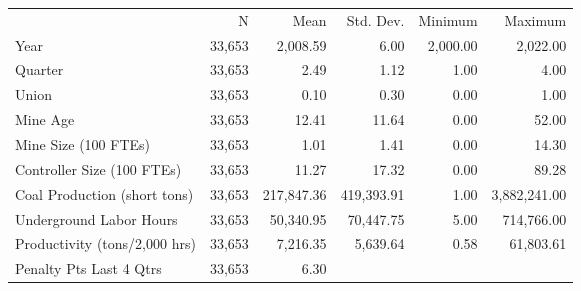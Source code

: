 \begin{table}[!h]
\centering
\begin{tabular}{llllll}
\cline{1-6}
\multicolumn{1}{c}{} &
  \multicolumn{1}{|r}{N} &
  \multicolumn{1}{r}{Mean} &
  \multicolumn{1}{r}{Std. Dev.} &
  \multicolumn{1}{r}{Minimum} &
  \multicolumn{1}{r}{Maximum} \\
\cline{1-6}
\multicolumn{1}{l}{Year} &
  \multicolumn{1}{|r}{33,653} &
  \multicolumn{1}{r}{2,008.59} &
  \multicolumn{1}{r}{6.00} &
  \multicolumn{1}{r}{2,000.00} &
  \multicolumn{1}{r}{2,022.00} \\
\multicolumn{1}{l}{Quarter} &
  \multicolumn{1}{|r}{33,653} &
  \multicolumn{1}{r}{2.49} &
  \multicolumn{1}{r}{1.12} &
  \multicolumn{1}{r}{1.00} &
  \multicolumn{1}{r}{4.00} \\
\multicolumn{1}{l}{Union} &
  \multicolumn{1}{|r}{33,653} &
  \multicolumn{1}{r}{0.10} &
  \multicolumn{1}{r}{0.30} &
  \multicolumn{1}{r}{0.00} &
  \multicolumn{1}{r}{1.00} \\
\multicolumn{1}{l}{Mine Age} &
  \multicolumn{1}{|r}{33,653} &
  \multicolumn{1}{r}{12.41} &
  \multicolumn{1}{r}{11.64} &
  \multicolumn{1}{r}{0.00} &
  \multicolumn{1}{r}{52.00} \\
\multicolumn{1}{l}{Mine Size (100 FTEs)} &
  \multicolumn{1}{|r}{33,653} &
  \multicolumn{1}{r}{1.01} &
  \multicolumn{1}{r}{1.41} &
  \multicolumn{1}{r}{0.00} &
  \multicolumn{1}{r}{14.30} \\
\multicolumn{1}{l}{Controller Size (100 FTEs)} &
  \multicolumn{1}{|r}{33,653} &
  \multicolumn{1}{r}{11.27} &
  \multicolumn{1}{r}{17.32} &
  \multicolumn{1}{r}{0.00} &
  \multicolumn{1}{r}{89.28} \\
\multicolumn{1}{l}{Coal Production (short tons)} &
  \multicolumn{1}{|r}{33,653} &
  \multicolumn{1}{r}{217,847.36} &
  \multicolumn{1}{r}{419,393.91} &
  \multicolumn{1}{r}{1.00} &
  \multicolumn{1}{r}{3,882,241.00} \\
\multicolumn{1}{l}{Underground Labor Hours} &
  \multicolumn{1}{|r}{33,653} &
  \multicolumn{1}{r}{50,340.95} &
  \multicolumn{1}{r}{70,447.75} &
  \multicolumn{1}{r}{5.00} &
  \multicolumn{1}{r}{714,766.00} \\
\multicolumn{1}{l}{Productivity (tons/2,000 hrs)} &
  \multicolumn{1}{|r}{33,653} &
  \multicolumn{1}{r}{7,216.35} &
  \multicolumn{1}{r}{5,639.64} &
  \multicolumn{1}{r}{0.58} &
  \multicolumn{1}{r}{61,803.61} \\
\multicolumn{1}{l}{Penalty Pts Last 4 Qtrs} &
  \multicolumn{1}{|r}{33,653} &
  \multicolumn{1}{r}{6.30} &

\end{tabular}
\end{table}
